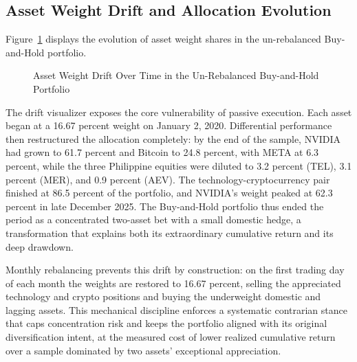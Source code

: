 \subsection{Asset Weight Drift and Allocation Evolution}

Figure~\ref{fig:rebalanced-weights} displays the evolution of asset weight shares in the un-rebalanced Buy-and-Hold portfolio.

\begin{figure}[H]
  \centering
  \caption{Asset Weight Drift Over Time in the Un-Rebalanced Buy-and-Hold Portfolio}
  \label{fig:rebalanced-weights}
\end{figure}

The drift visualizer exposes the core vulnerability of passive execution. Each asset began at a 16.67 percent weight on January 2, 2020. Differential performance then restructured the allocation completely: by the end of the sample, NVIDIA had grown to 61.7 percent and Bitcoin to 24.8 percent, with META at 6.3 percent, while the three Philippine equities were diluted to 3.2 percent (TEL), 3.1 percent (MER), and 0.9 percent (AEV). The technology-cryptocurrency pair finished at 86.5 percent of the portfolio, and NVIDIA's weight peaked at 62.3 percent in late December 2025. The Buy-and-Hold portfolio thus ended the period as a concentrated two-asset bet with a small domestic hedge, a transformation that explains both its extraordinary cumulative return and its deep drawdown.

Monthly rebalancing prevents this drift by construction: on the first trading day of each month the weights are restored to 16.67 percent, selling the appreciated technology and crypto positions and buying the underweight domestic and lagging assets. This mechanical discipline enforces a systematic contrarian stance that caps concentration risk and keeps the portfolio aligned with its original diversification intent, at the measured cost of lower realized cumulative return over a sample dominated by two assets' exceptional appreciation.
